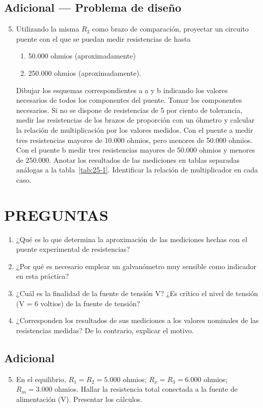 \documentclass{article}
\numberwithin{equation}{subsection}
\numberwithin{figure}{section}
\numberwithin{table}{section}
\begin{document}
\subsection{Adicional — Problema de diseño}
\begin{enumerate}
    \setcounter{enumi}{4}
    \item Utilizando la misma $R_3$ como brazo de comparación, proyectar un circuito puente con el que se puedan medir 
    resistencias de hasta
    \begin{enumerate}
        \item 50.000 ohmios (aproximadamente)
        \item 250.000 ohmios (aproximadamente).
    \end{enumerate}
    Dibujar los esquemas correspondientes a a y b indicando los valores necesarios de todos los componentes 
    del puente. Tomar los componentes necesarios. Si no se dispone de resistencias de 5 por ciento de tolerancia, 
    medir las resistencias de los brazos de proporción con un óhmetro y calcular la relación de multiplicación 
    por los valores medidos. Con el puente a medir tres resistencias mayores de 10.000 ohmios, pero menores 
    de 50.000 ohmios. Con el puente b medir tres resistencias mayores de 50.000 ohmios y menores de 250.000.
    Anotar los resultados de las mediciones en tablas separadas análogas a la tabla~\ref{tab:25-1}. Identificar la relación 
    de multiplicador en cada caso.
\end{enumerate}

\section{PREGUNTAS}
\begin{enumerate}
    \item ¿Qué es lo que determina la aproximación de las mediciones hechas con el puente experimental de resistencias?
    \item ¿Por qué es necesario emplear un galvanómetro muy sensible como indicador en esta práctica?
    \item ¿Cuál es la finalidad de la fuente de tensión V? ¿Es crítico el nivel de tensión (V = 6 voltios) de la 
    fuente de tensión?
    \item ¿Corresponden los resultados de sus mediciones a los valores nominales de las resistencias medidas? De lo 
    contrario, explicar el motivo.
\end{enumerate}

\subsection{Adicional}
\begin{enumerate}
    \setcounter{enumi}{4}
    \item En el equilibrio, $R_1 = R_2 = 5.000$ ohmios; $R_x = R_3 = 6.000$ ohmios; $R_m = 3.000$ ohmios. Hallar la 
    resistencia total conectada a la fuente de alimentación (V). Presentar los cálculos.
\end{enumerate}
\end{document}
